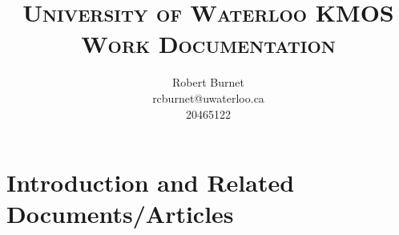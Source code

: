 \documentclass[10pt,letterpaper]{article}
\begin{document}
\title{\scshape\LARGE University of Waterloo \vfill \huge\bfseries KMOS Work Documentation \vfill}
\author{Robert Burnet \\ rcburnet@uwaterloo.ca \\ 20465122 }
\maketitle

\newpage

\tableofcontents

\listoffigures

\listoftables

\newpage

\section{Introduction and Related Documents/Articles}
\end{document}
